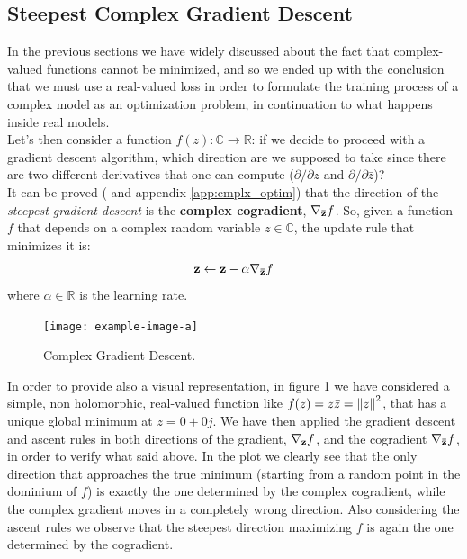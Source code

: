 \documentclass[../main.tex]{subfiles}
\begin{document}
\subsection{Steepest Complex Gradient Descent}
\label{sec:steepest_cmplx_gradient_descent}
In the previous sections we have widely discussed about the fact that complex-valued functions cannot be minimized, and so we ended up with the conclusion that we must use a real-valued loss in order to formulate the training process of a complex model as an optimization problem, in continuation to what happens inside real models.\\
Let's then consider a function $f(z):\mathds{C}\to\mathds{R}$: if we decide to proceed with a gradient descent algorithm, which direction are we supposed to take since there are two different derivatives that one can compute ($\partial/\partial z$ and $\partial/\partial \bar{z}$)?\\
It can be proved (\cite{amin_wirtinger, Hualiang_nonlinear} and appendix \ref{app:cmplx_optim}) that the direction of the \textit{steepest gradient descent} is the \textbf{complex cogradient}, $\vb{\nabla_{\bar{z}}}f$. So, given a function $f$ that depends on a complex random variable $z\in\mathds{C}$, the update rule that minimizes it is:
\begin{equation}
	\vb{z} \leftarrow \vb{z} - \alpha\vb{\nabla_{\bar{z}}}f
	\label{eq:cmplx_gradient_descent}
\end{equation}
where $\alpha\in\mathds{R}$ is the learning rate.

\begin{figure}[!ht]
	\centering
	\texttt{[image: example-image-a]}
	\caption{Complex Gradient Descent.}
	\label{fig:cmplx_gradient_descent}
\end{figure}

In order to provide also a visual representation, in figure \ref{fig:cmplx_gradient_descent} we have considered a simple, non holomorphic, real-valued function like $f(z) = z\bar{z} = \norm{z}^2$, that has a unique global minimum at $z=0+0j$. We have then applied the gradient descent and ascent rules in both directions of the gradient, $\vb{\nabla_z}f$, and the cogradient $\vb{\nabla_{\bar{z}}}f$, in order to verify what said above. In the plot we clearly see that the only direction that approaches the true minimum (starting from a random point in the dominium of $f$) is exactly the one determined by the complex cogradient, while the complex gradient moves in a completely wrong direction. Also considering the ascent rules we observe that the steepest direction maximizing $f$ is again the one determined by the cogradient.
\end{document}
